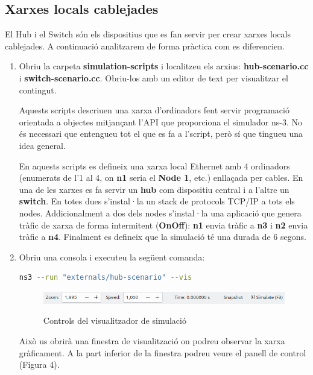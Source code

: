 \documentclass[12pt,a4paper]{article}
\begin{document}
\subsection{Xarxes locals cablejades}

El Hub i el Switch són els dispositius que es fan servir per crear xarxes locals cablejades. A continuació analitzarem de forma pràctica com es diferencien.
\begin{enumerate}
\item Obriu la carpeta \textbf{simulation-scripts} i localitzeu els arxius: \textbf{hub-scenario.cc} i \textbf{switch-scenario.cc}. Obriu-los amb un editor de text per visualitzar el contingut.

Aquests scripts descriuen una xarxa d'ordinadors fent servir programació orientada a objectes mitjançant l'API que proporciona el simulador ns-3. No és necessari que entengueu tot el que es fa a l'script, però sí que tingueu una idea general.


En aquests scripts es defineix una xarxa local Ethernet amb 4 ordinadors (enumerats de l'1 al 4, on \textbf{n1} seria el \textbf{Node 1}, etc.) enllaçada per cables. En una de les xarxes es fa servir un \textbf{hub} com dispositiu central i a l'altre un \textbf{switch}. En totes dues s'instal·la un stack de protocols TCP/IP a tots els nodes. Addicionalment a dos dels nodes s'instal·la una aplicació que genera tràfic de xarxa de forma intermitent (\textbf{OnOff}): \textbf{n1} envia tràfic a \textbf{n3} i \textbf{n2} envia tràfic a \textbf{n4}. Finalment es defineix que la simulació té una durada de 6 segons.

\item Obriu una consola i executeu la següent comanda:
\begin{lstlisting}[language=bash]
   ns3 --run "externals/hub-scenario" --vis
\end{lstlisting}

\begin{figure}[!ht]

  \begin{center}
  \label{simulator}
    \includegraphics[width=1\textwidth]{simulator}
    \caption{Controls del visualitzador de simulació}
  \end{center}
\end{figure}
Això us obrirà una finestra de visualització on podreu observar la xarxa gràficament. A la part inferior de la finestra podreu veure el panell de control (Figura 4).


\end{enumerate}
\end{document}

